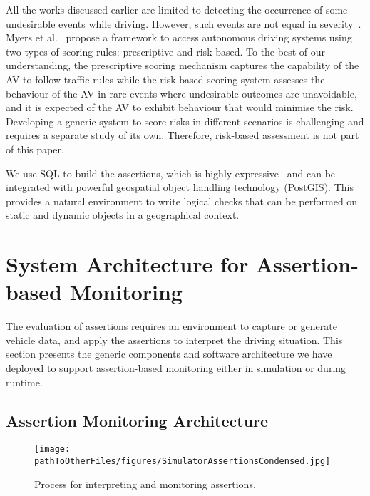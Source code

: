 All the works discussed earlier are limited to detecting the occurrence of some undesirable events while driving. However, such events are not equal in severity~\cite{sinha}. Myers et al.~\cite{myers} propose a framework to access autonomous driving systems using two types of scoring rules: prescriptive and risk-based. To the best of our understanding, the prescriptive scoring mechanism captures the capability of the AV to follow traffic rules while the risk-based scoring system assesses the behaviour of the AV in rare events where undesirable outcomes are unavoidable, and it is expected of the AV to exhibit behaviour that would minimise the risk. Developing a generic system to score risks in different scenarios is challenging and requires a separate study of its own. Therefore, risk-based assessment is not part of this paper.

We use SQL to build the assertions, which is highly expressive~\cite{sqllibkin} and can be integrated with powerful geospatial object handling technology (PostGIS). This provides a natural environment to write logical checks that can be performed on static and dynamic objects in a geographical context. 
%



\section{System Architecture for Assertion-based Monitoring} \label{generic_architecture}

The evaluation of assertions requires an environment to capture or generate vehicle data, and apply the assertions to interpret the driving situation. This section presents the generic components and software architecture we have deployed to support assertion-based monitoring either in simulation or during runtime.

\subsection{Assertion Monitoring Architecture} \label{generic_sim_system}

\begin{figure}
    \centering
    \texttt{[image: \\pathToOtherFiles/figures/SimulatorAssertionsCondensed.jpg]}
    \caption{Process for interpreting and monitoring assertions.}
    \label{fig:SimulatorArchitecture}
\end{figure}



